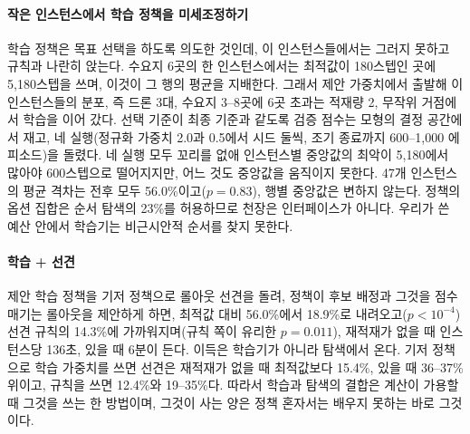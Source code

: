 \documentclass[final,5p,times,twocolumn]{elsarticle}
\begin{document}
\paragraph{작은 인스턴스에서 학습 정책을 미세조정하기}
학습 정책은 목표 선택을 하도록 의도한 것인데, 이 인스턴스들에서는 그러지 못하고 규칙과 나란히
앉는다. 수요지 6곳의 한 인스턴스에서는 최적값이 180스텝인 곳에 5{,}180스텝을 쓰며, 이것이 그 행의
평균을 지배한다. 그래서 제안 가중치에서 출발해 이 인스턴스들의 분포, 즉 드론 3대, 수요지 3--8곳에
6곳 초과는 적재량 2, 무작위 거점에서 학습을 이어 갔다. 선택 기준이 최종 기준과 같도록 검증 점수는
모형의 결정 공간에서 재고, 네 실행(정규화 가중치 2.0과 0.5에서 시드 둘씩, 조기 종료까지
600--1{,}000 에피소드)을 돌렸다. 네 실행 모두 꼬리를 없애 인스턴스별 중앙값의 최악이 5{,}180에서 많아야
600스텝으로 떨어지지만, 어느 것도 중앙값을 움직이지 못한다. 47개 인스턴스의 평균 격차는 전후 모두
56.0\%이고($p = 0.83$), 행별 중앙값은 변하지 않는다. 정책의 옵션 집합은 순서 탐색의 23\%를
허용하므로 천장은 인터페이스가 아니다. 우리가 쓴 예산 안에서 학습기는 비근시안적 순서를 찾지
못한다.

\paragraph{학습 + 선견}
제안 학습 정책을 기저 정책으로 롤아웃 선견을 돌려, 정책이 후보 배정과 그것을 점수 매기는 롤아웃을
제안하게 하면, 최적값 대비 56.0\%에서 18.9\%로 내려오고($p < 10^{-4}$) 선견 규칙의 14.3\%에
가까워지며(규칙 쪽이 유리한 $p = 0.011$), 재적재가 없을 때 인스턴스당 136초, 있을 때 6분이 든다.
이득은 학습기가 아니라 탐색에서 온다. 기저 정책으로 학습 가중치를 쓰면 선견은 재적재가 없을 때
최적값보다 15.4\%, 있을 때 36--37\% 위이고, 규칙을 쓰면 12.4\%와 19--35\%다. 따라서
학습과 탐색의 결합은 계산이 가용할 때 그것을 쓰는 한 방법이며, 그것이 사는 양은 정책 혼자서는
배우지 못하는 바로 그것이다.
\end{document}
